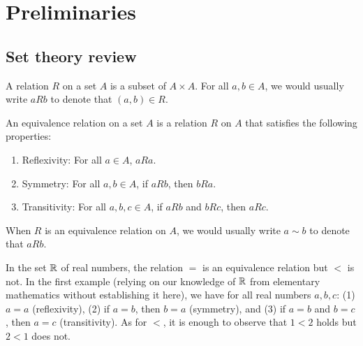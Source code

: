 \chapter{Preliminaries}
\label{ch:preliminaries}

\section{Set theory review}
\label{sec:set-theory-review}

\begin{definition}[Relation]
    A relation \(R\) on a set \(A\) is a subset of \(A \times A\). For all \(a,
    b \in A\), we would usually write \(a R b\) to denote that \((a, b) \in R\).
\end{definition}

\begin{definition}
    An equivalence relation on a set \(A\) is a relation \(R\) on \(A\) that
    satisfies the following properties:
    \begin{enumerate}[label=(\alph*)]
        \item Reflexivity: For all \(a \in A\), \(a R a\).
        \item Symmetry: For all \(a, b \in A\), if \(a R b\), then \(b R a\).
        \item Transitivity: For all \(a, b, c \in A\), if \(a R b\) and \(b R
        c\), then \(a R c\).
    \end{enumerate}

    When \(R\) is an equivalence relation on \(A\), we would usually write \(a
    \sim b\) to denote that \(a R b\).
\end{definition}

\begin{example}
    In the set \(\mathbb{R}\) of real numbers, the relation \(=\) is an equivalence
    relation but \(<\) is not. In the first example (relying on our knowledge of
    \(\mathbb{R}\) from elementary mathematics without establishing it here), we have
    for all real numbers \(a, b, c\): (1) \(a = a\) (reflexivity), (2) if \(a =
    b\), then \(b = a\) (symmetry), and (3) if \(a = b\) and \(b = c\), then \(a
    = c\) (transitivity). As for \(<\), it is enough to observe that \(1 < 2\)
    holds but \(2 < 1\) does not.
\end{example}

